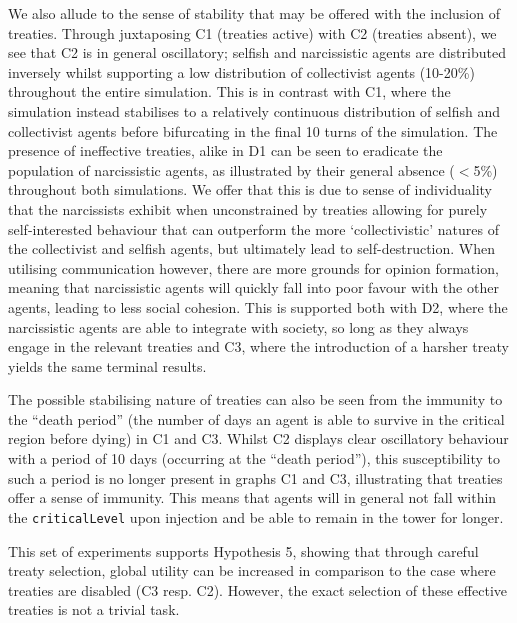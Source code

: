 We also allude to the sense of stability that may be offered with the inclusion of treaties. Through juxtaposing C1 (treaties active) with C2 (treaties absent), we see that C2 is in general oscillatory; selfish and narcissistic agents are distributed inversely whilst supporting a low distribution of collectivist agents (10-20\%) throughout the entire simulation. This is in contrast with C1, where the simulation instead stabilises to a relatively continuous distribution of selfish and collectivist agents before bifurcating in the final 10 turns of the simulation. The presence of ineffective treaties, alike in D1 can be seen to eradicate the population of narcissistic agents, as illustrated by their general absence ($<$5\%) throughout both simulations. We offer that this is due to sense of individuality that the narcissists exhibit when unconstrained by treaties allowing for purely self-interested behaviour that can outperform the more `collectivistic' natures of the collectivist and selfish agents, but ultimately lead to self-destruction. When utilising communication however, there are more grounds for opinion formation, meaning that narcissistic agents will quickly fall into poor favour with the other agents, leading to less social cohesion. This is supported both with D2, where the narcissistic agents are able to integrate with society, so long as they always engage in the relevant treaties and C3, where the introduction of a harsher treaty yields the same terminal results.

The possible stabilising nature of treaties can also be seen from the immunity to the ``death period'' (the number of days an agent is able to survive in the critical region before dying) in C1 and C3. Whilst C2 displays clear oscillatory behaviour with a period of 10 days (occurring at the ``death period''), this susceptibility to such a period is no longer present in graphs C1 and C3, illustrating that treaties offer a sense of immunity. This means that agents will in general not fall within the \texttt{criticalLevel} upon injection and be able to remain in the tower for longer.

This set of experiments supports Hypothesis 5, showing that through careful treaty selection, global utility can be increased in comparison to the case where treaties are disabled (C3 resp. C2). However, the exact selection of these effective treaties is not a trivial task.


